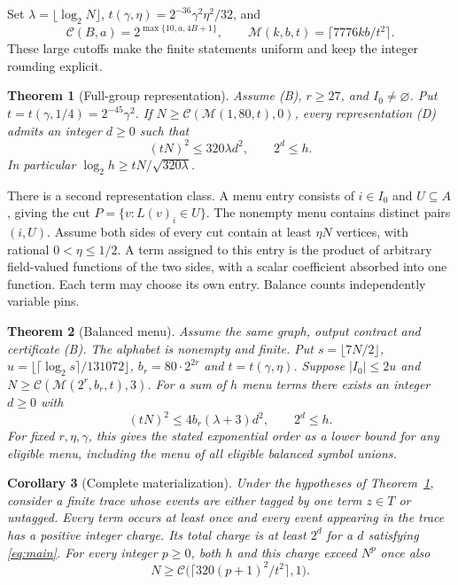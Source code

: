 \documentclass[
  11pt,
]{article}
\newtheorem{theorem}{Theorem}
\newtheorem{corollary}[theorem]{Corollary}
\newcommand{\floor}[1]{\lfloor #1\rfloor}
\newcommand{\ceil}[1]{\lceil #1\rceil}
\begin{document}
Set \(\lambda=\floor{\log_2 N}\),
\(t(\gamma,\eta)=2^{-36}\gamma^2\eta^2/32\), and
\[
 \mathcal C(B,a)=2^{\max\{10,a,4B+1\}},\qquad
 \mathcal M(k,b,t)=\ceil{7776kb/t^2}.
\]
These large cutoffs make the finite statements uniform and keep the
integer rounding explicit.

\begin{theorem}[Full-group representation]\label{thm:full}
Assume (B), \(r\ge27\), and \(I_0\ne\varnothing\).
Put \(t=t(\gamma,1/4)=2^{-45}\gamma^2\).
If \(N\ge\mathcal C(\mathcal M(1,80,t),0)\), every representation
(D) admits an integer \(d\ge0\) such that
\begin{equation}\tag{D1}\label{eq:main}
      (tN)^2\le 320\lambda d^2,\qquad 2^d\le h .
\end{equation}
In particular \(\log_2 h\ge tN/\sqrt{320\lambda}\).
\end{theorem}

There is a second representation class. A menu entry consists of
\(i\in I_0\) and \(U\subseteq A\), giving the cut
\(P=\{v:L(v)_i\in U\}\). The nonempty menu contains distinct pairs
\((i,U)\). Assume both sides of every cut contain at least \(\eta N\)
vertices, with rational \(0<\eta\le1/2\). A term assigned to this entry is
the product of arbitrary field-valued functions of the two sides, with a
scalar coefficient absorbed into one function. Each term may choose
its own entry. Balance counts independently variable pins.

\begin{theorem}[Balanced menu]\label{thm:menu}
Assume the same graph, output contract and certificate (B). The alphabet is nonempty and finite. Put
\(s=\floor{7N/2}\), \(u=\floor{\ceil{\log_2 s}/131072}\),
\(b_r=80\cdot2^{2r}\) and \(t=t(\gamma,\eta)\). Suppose
\(|I_0|\le 2u\) and \(N\ge\mathcal C(\mathcal M(2^r,b_r,t),3)\).
For a sum of \(h\) menu terms there exists an integer \(d\ge0\) with
\[
      (tN)^2\le 4 b_r(\lambda+3)d^2,\qquad 2^d\le h .
\]
For fixed \(r,\eta,\gamma\), this gives the stated exponential order as
a lower bound for any eligible menu, including the menu of all eligible
balanced symbol unions.
\end{theorem}

\begin{corollary}[Complete materialization]\label{cor:cost}
Under the hypotheses of Theorem~\ref{thm:full}, consider a finite trace
whose events are either tagged by one term \(z\in T\) or untagged. Every
term occurs at least once and every event appearing in the trace has a
positive integer charge. Its total charge is at least \(2^d\) for a \(d\)
satisfying \eqref{eq:main}. For every integer \(p\ge0\), both \(h\) and this
charge exceed \(N^p\) once also
\[
     N\ge\mathcal C\bigl(\ceil{320(p+1)^2/t^2},1\bigr).
\]
\end{corollary}
\end{document}
